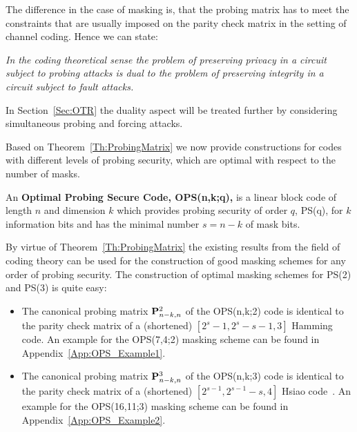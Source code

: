 \documentclass[11pt]{llncs}
\newcommand{\BDEF}{\begin{definition}}  \newcommand{\EDEF}{\end{definition}}
\begin{document}
The difference in the case of masking is, that the probing matrix
has to meet the constraints that are usually imposed on the parity check matrix
in the setting of channel coding.
Hence we can state:
\begin{center}
\begin{minipage}{0.83\textwidth}
 \em In the coding theoretical sense
     the problem of preserving privacy in a circuit subject to probing attacks
     is dual to
     the problem of preserving integrity in a circuit subject to fault attacks.
 \end{minipage}
\end{center}
In Section~\ref{Sec:OTR} the duality aspect will be treated further by
considering simultaneous probing and forcing attacks.

Based on Theorem~\ref{Th:ProbingMatrix} we now provide
constructions for codes with different levels of probing security,
which are optimal with respect to the number of masks.
\BDEF\label{Def:OPS}
An \textbf{Optimal Probing Secure Code, OPS(n,k;q),}
is a linear block code of length $n$ and dimension $k$
which provides probing security of order $q$, PS(q),
for $k$ information bits
and has the minimal number $s = n-k$ of mask bits.
\EDEF
By virtue of Theorem~\ref{Th:ProbingMatrix} the existing results
from the field of coding theory can be used for the construction
of good masking schemes for any order of probing security.
The construction of optimal masking schemes for PS(2) and PS(3)
is quite easy:
\begin{itemize}
\item The canonical probing matrix $\mathbf{P}_{n-k,n}^2$
of the OPS(n,k;2) code is identical
to the parity check matrix of a (shortened)
$[2^s-1,2^s-s-1,3]$ Hamming code.
An example for the OPS(7,4;2) masking scheme can be found in
Appendix~\ref{App:OPS_Example1}.

\item The canonical probing matrix $\mathbf{P}_{n-k,n}^3$
of the OPS(n,k;3) code is identical
to the parity check matrix of a (shortened)
$[2^{s-1},2^{s-1}-s,4]$ Hsiao code~\cite{Hsiao1970ClassofOptimal}.
An example for the OPS(16,11;3) masking scheme can be found in
Appendix~\ref{App:OPS_Example2}.
\end{itemize}
\end{document}
